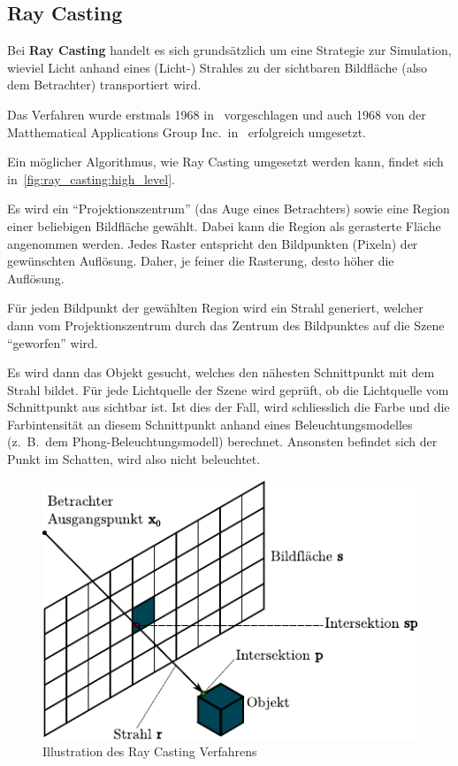 \subsection{Ray Casting}
\label{subsec:ray_casting}

Bei \textbf{Ray Casting} handelt es sich grundsätzlich um eine Strategie zur
Simulation, wieviel Licht anhand eines (Licht-) Strahles zu der sichtbaren
Bildfläche (also dem Betrachter) transportiert wird.

Das Verfahren wurde erstmals 1968 in~\cite{appel_techniques_1968}
vorgeschlagen und auch 1968 von der Matthematical Applications Group
Inc.\ in~\cite{arlington_mathematical_applications_group_inc_afips_1968}
erfolgreich umgesetzt.

Ein möglicher Algorithmus, wie Ray Casting umgesetzt werden kann, findet
sich in~\ref{fig:ray_casting:high_level}.

Es wird ein ``Projektionszentrum'' (das Auge eines Betrachters) sowie
eine Region einer beliebigen Bildfläche gewählt. Dabei kann die Region
als gerasterte Fläche angenommen werden. Jedes Raster entspricht den
Bildpunkten (Pixeln) der gewünschten Auflösung.  Daher, je feiner die
Rasterung, desto höher die Auflösung.

Für jeden Bildpunkt der gewählten Region wird ein Strahl
generiert, welcher dann vom Projektionszentrum durch das Zentrum des
Bildpunktes auf die Szene ``geworfen'' wird. 

Es wird dann das Objekt gesucht, welches den nähesten Schnittpunkt mit
dem Strahl bildet. Für jede Lichtquelle der Szene wird geprüft, ob die
Lichtquelle vom Schnittpunkt aus sichtbar ist. Ist dies der Fall, wird
schliesslich die Farbe und die Farbintensität an diesem Schnittpunkt
anhand eines Beleuchtungsmodelles (z.\ B.\ dem Phong-Beleuchtungsmodell)
berechnet. Ansonsten befindet sich der Punkt im Schatten, wird also
nicht beleuchtet.

\begin{figure}[H]\label{fig:ray_casting_illustration}
    \centering
    \includegraphics{img/ray_casting.pdf}
    \caption{Illustration des Ray Casting Verfahrens\protect\footnotemark}
\end{figure}

